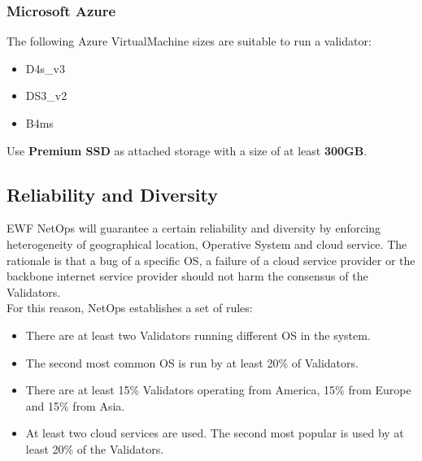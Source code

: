 \subsubsection{Microsoft Azure}

The following Azure VirtualMachine sizes are suitable to run a validator:

\begin{itemize}
    \item D4s\_v3
    \item DS3\_v2
    \item B4ms
\end{itemize}

Use \textbf{Premium SSD} as attached storage with a size of at least \textbf{300GB}.

\subsection{Reliability and Diversity}

EWF NetOps will guarantee a certain reliability and diversity by enforcing heterogeneity of geographical location, Operative System and cloud service. The rationale is that a bug of a specific OS, a failure of a cloud service provider or the backbone internet service provider should not harm the consensus of the Validators. \\
For this reason, NetOps establishes a set of rules:

\begin {itemize}
    \item There are at least two Validators running different OS in the system.
    \item The second most common OS is run by at least 20\% of Validators.
    \item There are at least 15\% Validators operating from America, 15\% from Europe and 15\% from Asia.
    \item At least two cloud services are used. The second most popular is used by at least 20\% of the Validators.
\end{itemize}